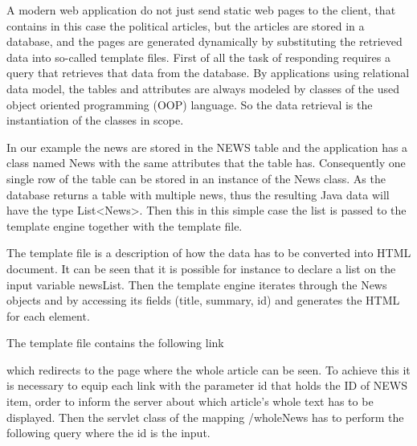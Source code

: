 
A modern web application do not just send static web pages to the client, that contains in this case the political articles, but the articles are stored in a database, and the pages are generated dynamically by substituting the retrieved data into so-called template files. 
First of all the task of responding requires a query that retrieves that data from the database. By applications using relational data model, the tables and attributes are always modeled by classes of the used object oriented programming (OOP) language. So the data retrieval is the instantiation of the classes in scope. 


In our example the news are stored in the NEWS table and the application has a class named News with the same attributes that the table has.  Consequently one single row of the table can be stored in an instance of the News class. As the database returns a table with multiple news, thus the resulting Java data will have the type List<News>. Then this in this simple case the list is passed to the template engine together with the template file. 


The template file is a description of how the data has to be converted into HTML document. It can be seen that it is possible for instance to declare a list on the input variable newsList. Then the template engine iterates through the News objects and by accessing its fields (title, summary, id) and generates the HTML for each element. 

The template file contains the following link

\begin{center}
	\scriptsize{}
\end{center}

which redirects to the page where the whole article can be seen. To achieve this it is necessary to equip each link with the parameter id that holds the ID of NEWS item, order to inform the server about which article’s whole text has to be displayed. Then the servlet class of the mapping /wholeNews has to perform the following query where the id is the input.


